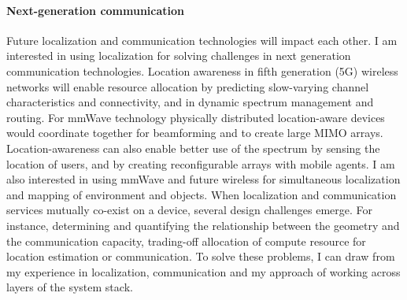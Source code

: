 \documentclass[10pt]{article}
\begin{document}
\paragraph{Next-generation communication}
Future localization and communication technologies will impact each other. 
I am interested in using localization for solving challenges in next generation communication technologies. %
Location awareness in fifth generation (5G) wireless networks will enable resource allocation by predicting slow-varying channel characteristics and connectivity, and in dynamic spectrum management and routing. 
For mmWave technology physically distributed location-aware devices would coordinate together for beamforming and to create large MIMO arrays. 
Location-awareness can also enable better use of the spectrum by sensing the location of users, and by creating reconfigurable arrays with mobile agents. 
I am also interested in using mmWave and future wireless for simultaneous localization and mapping of environment and objects. 
When localization and communication services mutually co-exist on a device, several design challenges emerge. For instance, determining and quantifying the relationship between the geometry and the communication capacity, trading-off allocation of compute resource for location estimation or communication. To solve these problems, I can draw from my experience in localization, communication and my approach of working across layers of the system stack.  






\end{document}
